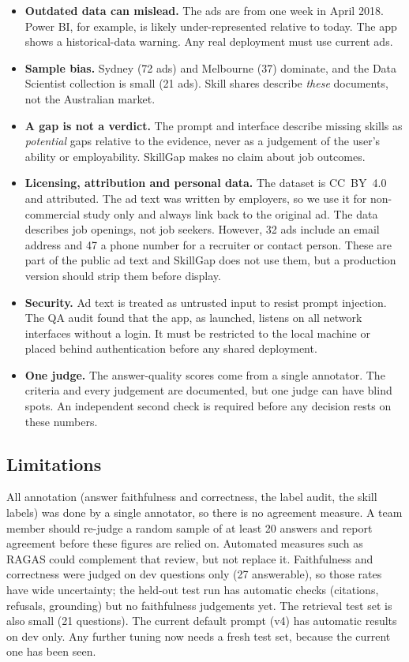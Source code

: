 \begin{itemize}
  \item \textbf{Outdated data can mislead.} The ads are from one week in April 2018. Power BI, for example, is likely under-represented relative to today. The app shows a historical-data warning. Any real deployment must use current ads.
  \item \textbf{Sample bias.} Sydney (72 ads) and Melbourne (37) dominate, and the Data Scientist collection is small (21 ads). Skill shares describe \emph{these} documents, not the Australian market.
  \item \textbf{A gap is not a verdict.} The prompt and interface describe missing skills as \emph{potential} gaps relative to the evidence, never as a judgement of the user's ability or employability. SkillGap makes no claim about job outcomes.
  \item \textbf{Licensing, attribution and personal data.} The dataset is CC~BY~4.0 and attributed. The ad text was written by employers, so we use it for non-commercial study only and always link back to the original ad. The data describes job openings, not job seekers. However, 32 ads include an email address and 47 a phone number for a recruiter or contact person. These are part of the public ad text and SkillGap does not use them, but a production version should strip them before display.
  \item \textbf{Security.} Ad text is treated as untrusted input to resist prompt injection. The QA audit found that the app, as launched, listens on all network interfaces without a login. It must be restricted to the local machine or placed behind authentication before any shared deployment.
  \item \textbf{One judge.} The answer-quality scores come from a single annotator. The criteria and every judgement are documented, but one judge can have blind spots. An independent second check is required before any decision rests on these numbers.
\end{itemize}

\subsection{Limitations}\label{sec:limits}

All annotation (answer faithfulness and correctness, the label audit, the skill labels) was done by a single annotator, so there is no agreement measure. A team member should re-judge a random sample of at least 20 answers and report agreement before these figures are relied on. Automated measures such as RAGAS \citep{es2024ragas} could complement that review, but not replace it. Faithfulness and correctness were judged on dev questions only (27 answerable), so those rates have wide uncertainty; the held-out test run has automatic checks (citations, refusals, grounding) but no faithfulness judgements yet. The retrieval test set is also small (21 questions). The current default prompt (v4) has automatic results on dev only. Any further tuning now needs a fresh test set, because the current one has been seen.

